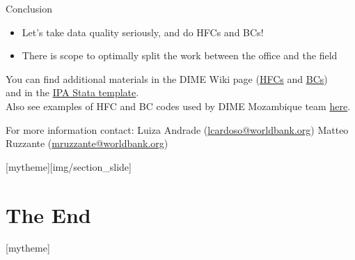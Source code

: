 \documentclass[aspectratio=169]{beamer}
\newcommand{\sectionpic}[2]{
	\setbeamertemplate{section page}[mytheme][#2]
	\section{#1}
	\setbeamertemplate{section page}[mytheme]
}
\begin{document}
\begin{frame}{Conclusion}

    \begin{itemize}
        \item Let's take data quality seriously, and do HFCs and BCs!
        \item There is scope to optimally split the work between the office and the field
    \end{itemize}
    
    \vspace{1.25em}
    You can find additional materials in the DIME Wiki page (\textcolor{blue}{\hyperlink{https://dimewiki.worldbank.org/wiki/Monitoring_Data_Quality}{HFCs}} and \textcolor{blue}{\hyperlink{https://dimewiki.worldbank.org/wiki/Back_Checks}{BCs}}) \\ and in the \textcolor{blue}{\hyperlink{https://github.com/PovertyAction/high-frequency-checks}{IPA Stata template}}. \\
    Also see examples of HFC and BC codes used by DIME Mozambique team \textcolor{blue}{\hyperlink{ADD LINK HERE}{here}}.
    
    \vspace{1.25em}
    For more information contact:
    \newline Luiza Andrade (\url{lcardoso@worldbank.org})
    \newline Matteo Ruzzante (\url{mruzzante@worldbank.org}) 

\end{frame}

\sectionpic{The End}{img/section_slide}
\end{document}
